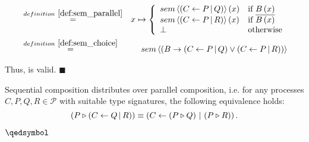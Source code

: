 \begin{myproof}
\begin{eqnarray*}
  & \overset{\defref{def:sem_parallel}}{=} & x \mapsto \left\{\begin{array}{ll}
                                                      \sem{\parallel{C}{P}{Q}} \left( x \right) & \text{if } B \left( x \right) \\
                                                      \sem{\parallel{C}{P}{R}} \left( x \right) & \text{if } \overline{B \left( x \right)} \\
                                                      \bot & \text{otherwise}
                                                    \end{array}
                                             \right. \\
  & \overset{\defref{def:sem_choice}}{=}   & \sem{\choice{B}{\parallel{C}{P}{Q}}{\parallel{C}{P}{R}}}
\end{eqnarray*}

\vspace*{-1em}
Thus,  is valid. \hfill$\blacksquare$
\end{myproof}


\begin{theorem}
\label{thm:distributivity_sequence_parallel}
Sequential composition distributes over parallel composition, i.e. for any processes $C, P, Q, R \in \mathcal{P}$ with suitable type signatures, the following equivalence holds:
\begin{equation*}
  \left( P \triangleright \left( C \gets Q \, | \, R \right) \right) \equiv \left( C \gets \left( P \triangleright Q \right) \, | \, \left( P \triangleright R \right) \right).
\end{equation*}

\vspace*{-1em}
\hfill$\qedsymbol$
\end{theorem}

